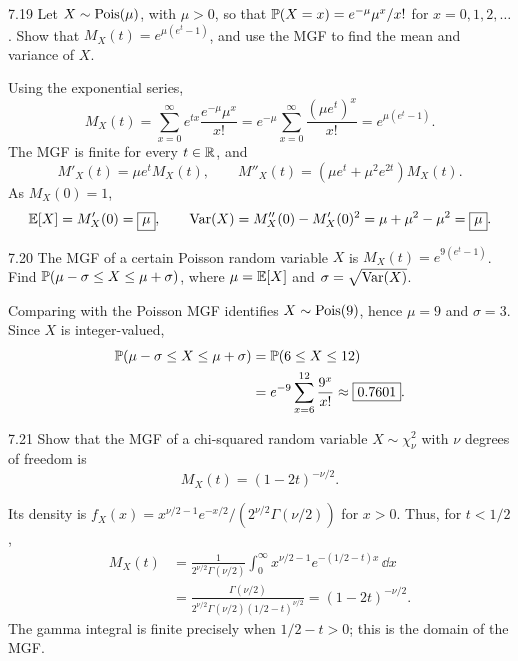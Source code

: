 \documentclass[11pt,oneside]{article}
\begin{document}
\begin{exercise}{7.19}
Let $X\sim\operatorname{Pois}(\mu)$, with $\mu>0$, so that $\mathbb{P}(X=x)=e^{-\mu}\mu^x/x!$ for $x=0, 1, 2, \ldots$. Show that $M_X(t)=e^{\mu(e^t-1)}$, and use the MGF to find the mean and variance of $X$.
\end{exercise}
\begin{solution}
Using the exponential series,
\[
M_X(t)=\sum_{x=0}^\infty e^{tx}\frac{e^{-\mu}\mu^x}{x!}
=e^{-\mu}\sum_{x=0}^\infty\frac{(\mu e^t)^x}{x!}
=\boxed{e^{\mu(e^t-1)}}.
\]
The MGF is finite for every $t\in\mathbb{R}$, and
\[
M'_X(t)=\mu e^tM_X(t), \qquad
M''_X(t)=(\mu e^t+\mu^2e^{2t})M_X(t).
\]
As $M_X(0)=1$,
\[
\mathbb{E}[X]=M'_X(0)=\boxed{\mu}, \qquad
\operatorname{Var}(X)=M''_X(0)-M'_X(0)^2
=\mu+\mu^2-\mu^2=\boxed{\mu}.
\]
\end{solution}

\begin{exercise}{7.20}
The MGF of a certain Poisson random variable $X$ is $M_X(t)=e^{9(e^t-1)}$. Find $\mathbb{P}(\mu-\sigma\le X\le\mu+\sigma)$, where $\mu=\mathbb{E}[X]$ and $\sigma=\sqrt{\operatorname{Var}(X)}$.
\end{exercise}
\begin{solution}
Comparing with the Poisson MGF identifies $X\sim\operatorname{Pois}(9)$, hence $\mu=9$ and $\sigma=3$. Since $X$ is integer-valued,
\[
\begin{aligned}
\mathbb{P}(\mu-\sigma\le X\le\mu+\sigma)
&=\mathbb{P}(6\le X\le12)\\
&=e^{-9}\sum_{x=6}^{12}\frac{9^x}{x!}
\approx\boxed{0.7601}.
\end{aligned}
\]
\end{solution}

\begin{exercise}{7.21}
Show that the MGF of a chi-squared random variable $X\sim\chi^2_\nu$ with $\nu$ degrees of freedom is
\[
M_X(t)=(1-2t)^{-\nu/2}.
\]
\end{exercise}
\begin{solution}
Its density is $f_X(x)=x^{\nu/2-1}e^{-x/2}/(2^{\nu/2}\Gamma(\nu/2))$ for $x>0$. Thus, for $t<1/2$,
\[
\begin{aligned}
M_X(t)
&=\frac1{2^{\nu/2}\Gamma(\nu/2)}
\int_0^\infty x^{\nu/2-1}e^{-(1/2-t)x}\,\dd x\\
&=\frac{\Gamma(\nu/2)}{2^{\nu/2}\Gamma(\nu/2)(1/2-t)^{\nu/2}}
=\boxed{(1-2t)^{-\nu/2}}.
\end{aligned}
\]
The gamma integral is finite precisely when $1/2-t>0$; this is the domain of the MGF.
\end{solution}
\end{document}
